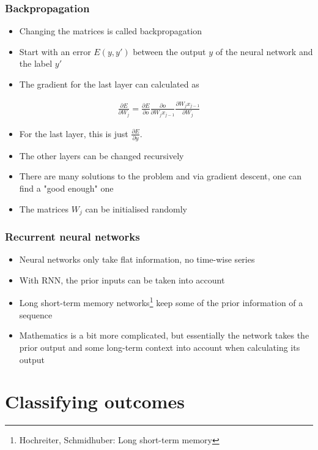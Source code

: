 \documentclass{beamer}
\begin{document}
\begin{frame}
\frametitle{Backpropagation}
\begin{itemize}
\item Changing the matrices is called backpropagation
\item Start with an error $E(y, y')$ between the output $y$ of the neural network and the label $y'$
\item The gradient for the last layer can calculated as
\end{itemize}
\begin{align*}
\frac{\partial E}{\partial W_j} = \frac{\partial E}{\partial o}\frac{\partial o}{\partial W_jx_{j-1}}\frac{\partial W_j x_{j-1}}{\partial W_j}
\end{align*}
\begin{itemize}
\item For the last layer, this is just $\frac{\partial E}{\partial y}$.
\item The other layers can be changed recursively
\item There are many solutions to the problem and via gradient descent, one can find a "good enough" one
\item The matrices $W_j$ can be initialised randomly
\end{itemize}
\end{frame}

\begin{frame}
\frametitle{Recurrent neural networks}
\begin{itemize}
\item Neural networks only take flat information, no time-wise series
\item With RNN, the prior inputs can be taken into account
\item Long short-term memory networks\footnote{Hochreiter, Schmidhuber: Long short-term memory} keep some of the prior information of a sequence
\item Mathematics is a bit more complicated, but essentially the network takes the prior output and some long-term context into account when calculating its output
\end{itemize}
\end{frame}

\section{Classifying outcomes}
\end{document}
